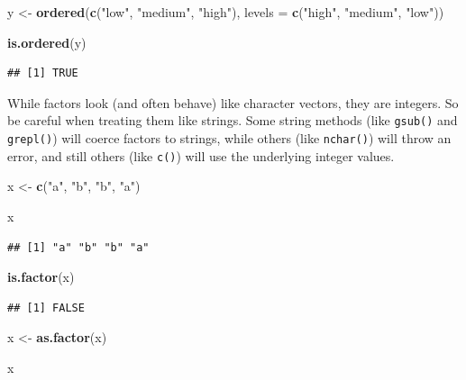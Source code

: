 \documentclass[
]{book}
\newenvironment{Shaded}{\begin{snugshade}}{\end{snugshade}}
\newcommand{\AttributeTok}[1]{\textcolor[rgb]{0.13,0.29,0.53}{#1}}
\newcommand{\FunctionTok}[1]{\textcolor[rgb]{0.13,0.29,0.53}{\textbf{#1}}}
\newcommand{\NormalTok}[1]{#1}
\newcommand{\OtherTok}[1]{\textcolor[rgb]{0.56,0.35,0.01}{#1}}
\newcommand{\StringTok}[1]{\textcolor[rgb]{0.31,0.60,0.02}{#1}}
\begin{document}
\begin{Shaded}
\begin{Highlighting}[]
\NormalTok{y }\OtherTok{\textless{}{-}} \FunctionTok{ordered}\NormalTok{(}\FunctionTok{c}\NormalTok{(}\StringTok{"low"}\NormalTok{, }\StringTok{"medium"}\NormalTok{, }\StringTok{"high"}\NormalTok{), }\AttributeTok{levels =} \FunctionTok{c}\NormalTok{(}\StringTok{"high"}\NormalTok{, }\StringTok{"medium"}\NormalTok{, }\StringTok{"low"}\NormalTok{))}

\FunctionTok{is.ordered}\NormalTok{(y)}
\end{Highlighting}
\end{Shaded}

\begin{verbatim}
## [1] TRUE
\end{verbatim}

While factors look (and often behave) like character vectors, they are integers. So be careful when treating them like strings. Some string methods (like \texttt{gsub()} and \texttt{grepl()}) will coerce factors to strings, while others (like \texttt{nchar()}) will throw an error, and still others (like \texttt{c()}) will use the underlying integer values.

\begin{Shaded}
\begin{Highlighting}[]
\NormalTok{x }\OtherTok{\textless{}{-}} \FunctionTok{c}\NormalTok{(}\StringTok{"a"}\NormalTok{, }\StringTok{"b"}\NormalTok{, }\StringTok{"b"}\NormalTok{, }\StringTok{"a"}\NormalTok{)}

\NormalTok{x}
\end{Highlighting}
\end{Shaded}

\begin{verbatim}
## [1] "a" "b" "b" "a"
\end{verbatim}

\begin{Shaded}
\begin{Highlighting}[]
\FunctionTok{is.factor}\NormalTok{(x)}
\end{Highlighting}
\end{Shaded}

\begin{verbatim}
## [1] FALSE
\end{verbatim}

\begin{Shaded}
\begin{Highlighting}[]
\NormalTok{x }\OtherTok{\textless{}{-}} \FunctionTok{as.factor}\NormalTok{(x)}

\NormalTok{x}
\end{Highlighting}
\end{Shaded}
\end{document}
